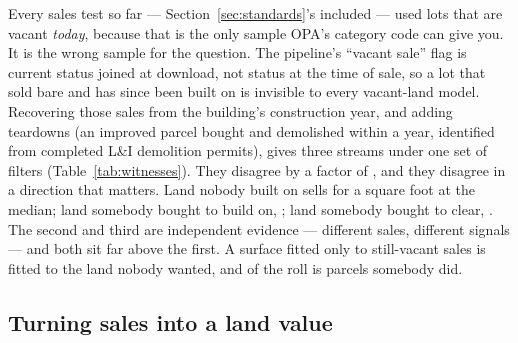 \documentclass[11pt]{article}
\begin{document}
Every sales test so far --- Section~\ref{sec:standards}'s included --- used lots that are
vacant \emph{today}, because that is the only sample OPA's category code can give you. It is
the wrong sample for the question. The pipeline's ``vacant sale'' flag is current status joined
at download, not status at the time of sale, so a lot that sold bare and has since been built
on is invisible to every vacant-land model. Recovering those sales from the building's
construction year, and adding teardowns (an improved parcel bought and demolished within a
year, identified from completed L\&I demolition permits), gives three streams under one set of
filters (Table~\ref{tab:witnesses}). They disagree by a factor of \LycdWtwoOverWone{}, and they
disagree in a direction that matters. Land nobody built on sells for \LycdWonePsf{} a square
foot at the median; land somebody bought to build on, \LycdWonebPsf{}; land somebody bought
to clear, \LycdWtwoPsf{}. The second and third are independent evidence --- different sales,
different signals --- and both sit far above the first. A surface fitted only to still-vacant
sales is fitted to the land nobody wanted, and \LycdImprovedSharePct{} of the roll is parcels
somebody did.

\subsection{Turning sales into a land value}

\begin{table}[t]
  \centering
  \caption{Held-out accuracy against \LycdHeldoutN{} land sales, all three streams pooled.
  Five folds assigned by parcel; every fitted surface is refitted inside each fold, and the
  extraction is re-levelled inside each fold rather than against the sales it is scored on. The
  COD is trimmed of the outer 5\% of ratios at each end and applied identically to every %
  surface; the raw figure is the same statistic untrimmed. \LycdHeldoutUntabulated{} further
  candidates, mostly variants of these, were scored on the same rows and are not shown.}
  \label{tab:heldout}
  
\end{table}
\end{document}
